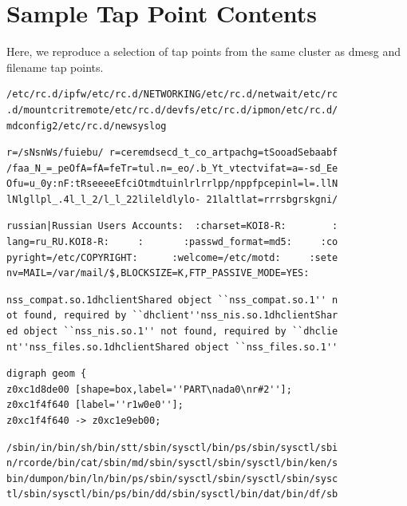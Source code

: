 \appendix
\label{app:tap-point-contents}
\section{Sample Tap Point Contents}


Here, we reproduce a selection of tap points from the same cluster as
dmesg and filename tap points.

\small

\begin{verbatim}
/etc/rc.d/ipfw/etc/rc.d/NETWORKING/etc/rc.d/netwait/etc/rc
.d/mountcritremote/etc/rc.d/devfs/etc/rc.d/ipmon/etc/rc.d/
mdconfig2/etc/rc.d/newsyslog
\end{verbatim}

\begin{verbatim}
r=/sNsnWs/fuiebu/ r=ceremdsecd_t_co_artpachg=tSooadSebaabf
/faa_N_=_peOfA=fA=feTr=tul.n=_eo/.b_Yt_vtectvifat=a=-sd_Ee
Ofu=u_0y:nF:tRseeeeEfciOtmdtuinlrlrrlpp/nppfpcepinl=l=.llN
lNlgllpl_.4l_l_2/l_l_22lileldlylo- 21laltlat=rrrsbgrskgni/
\end{verbatim}

\begin{verbatim}
russian|Russian Users Accounts:  :charset=KOI8-R:        :
lang=ru_RU.KOI8-R:     :       :passwd_format=md5:     :co
pyright=/etc/COPYRIGHT:      :welcome=/etc/motd:     :sete
nv=MAIL=/var/mail/$,BLOCKSIZE=K,FTP_PASSIVE_MODE=YES:     
\end{verbatim}

\begin{verbatim}
nss_compat.so.1dhclientShared object ``nss_compat.so.1'' n
ot found, required by ``dhclient''nss_nis.so.1dhclientShar
ed object ``nss_nis.so.1'' not found, required by ``dhclie
nt''nss_files.so.1dhclientShared object ``nss_files.so.1''
\end{verbatim}

\begin{verbatim}
digraph geom {
z0xc1d8de00 [shape=box,label=''PART\nada0\nr#2''];
z0xc1f4f640 [label=''r1w0e0''];
z0xc1f4f640 -> z0xc1e9eb00;
\end{verbatim}

\begin{verbatim}
/sbin/in/bin/sh/bin/stt/sbin/sysctl/bin/ps/sbin/sysctl/sbi
n/rcorde/bin/cat/sbin/md/sbin/sysctl/sbin/sysctl/bin/ken/s
bin/dumpon/bin/ln/bin/ps/sbin/sysctl/sbin/sysctl/sbin/sysc
tl/sbin/sysctl/bin/ps/bin/dd/sbin/sysctl/bin/dat/bin/df/sb
\end{verbatim}

